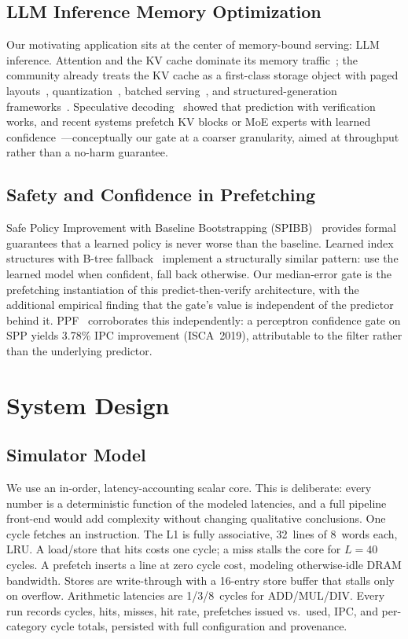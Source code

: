 \documentclass[sigplan,anonymous,review,nonacm]{acmart}
\begin{document}
\subsection{LLM Inference Memory Optimization}

Our motivating application sits at the center of memory-bound serving: LLM
inference. Attention and the KV cache dominate its memory
traffic~\cite{pope2023,kwon2023vllm}; the community already treats the KV
cache as a first-class storage object with paged
layouts~\cite{kwon2023vllm,kvcache_streamed}, quantization~\cite{kvcache_quant},
batched serving~\cite{orca,sarathi}, and structured-generation
frameworks~\cite{sglang}. Speculative
decoding~\cite{leviathan2023} showed that prediction with verification
works, and recent systems prefetch KV blocks or MoE experts with learned
confidence~\cite{kvcache_lookahead,apex,kvcache_moe}---conceptually our
gate at a coarser granularity, aimed at throughput rather than a no-harm
guarantee.

\subsection{Safety and Confidence in Prefetching}

Safe Policy Improvement with Baseline Bootstrapping (SPIBB)~\cite{laroche2019}
provides formal guarantees that a learned policy is never worse than the
baseline. Learned index structures with B-tree fallback~\cite{kraska2018}
implement a structurally similar pattern: use the learned model when confident,
fall back otherwise. Our median-error gate is the prefetching instantiation of
this predict-then-verify architecture, with the additional empirical finding
that the gate's value is independent of the predictor behind it.
PPF~\cite{ppf} corroborates this independently: a perceptron confidence
gate on SPP yields 3.78\% IPC improvement (ISCA~2019), attributable to
the filter rather than the underlying predictor.

\section{System Design}
\label{sec:design}

\subsection{Simulator Model}
\label{sec:simulator}

We use an in-order, latency-accounting scalar core. This is deliberate:
every number is a deterministic function of the modeled latencies, and a
full pipeline front-end would add complexity without changing qualitative
conclusions. One cycle fetches an instruction. The L1 is fully associative,
32~lines of 8~words each, LRU. A load/store that hits costs one cycle; a
miss stalls the core for $L = 40$ cycles. A prefetch inserts a line at zero
cycle cost, modeling otherwise-idle DRAM bandwidth. Stores are write-through
with a 16-entry store buffer that stalls only on overflow. Arithmetic
latencies are 1/3/8~cycles for ADD/MUL/DIV. Every run records cycles, hits,
misses, hit rate, prefetches issued vs.\ used, IPC, and per-category cycle
totals, persisted with full configuration and provenance.
\end{document}
